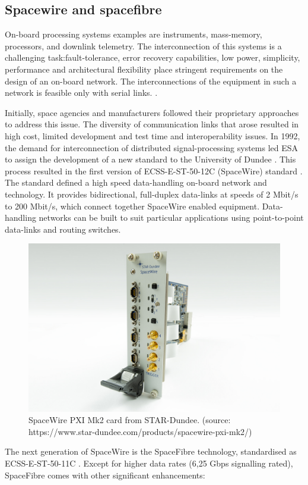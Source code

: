 \subsection{Spacewire and spacefibre}\label{subsubsec:spfi}
On-board processing systems examples are instruments, mass-memory, processors, and downlink telemetry. The interconnection of this systems is a challenging task:fault-tolerance, error recovery capabilities, low power, simplicity, performance and architectural flexibility place stringent requirements on the design of an on-board network. The interconnections of the equipment in such a network is feasible only with serial links. \cite{Athavale2005}.\par
Initially, space agencies and manufacturers followed their proprietary approaches to address this issue. The diversity of communication links that arose resulted in high cost, limited development and test time and interoperability issues. In 1992, the demand for interconnection of distributed signal-processing systems led ESA to assign the development of a new standard to the University of Dundee \cite{Parkes2012}. This process resulted in the first version of ECSS-E-ST-50-12C (SpaceWire) standard \cite{spwire}.
The standard defined a high speed data-handling on-board network and technology. It provides bidirectional, full-duplex data-links at speeds of 2 Mbit/s to 200 Mbit/s, which connect together SpaceWire enabled equipment. Data-handling networks can be built to suit particular applications using point-to-point data-links and routing switches.\par
	\begin{figure}
		\centering
		\includegraphics[width=0.5\linewidth]{Figures/pxi_interface_8hp_front.jpg}
		\caption{SpaceWire PXI Mk2 card from STAR-Dundee. (source: https://www.star-dundee.com/products/spacewire-pxi-mk2/)}
		\label{fig:A}
	\end{figure}
The next generation of SpaceWire is the SpaceFibre technology, standardised as ECSS-E-ST-50-11C \cite{spfibre}. Except for higher data rates (6,25 Gbps signalling rated), SpaceFibre comes with other significant enhancements:
